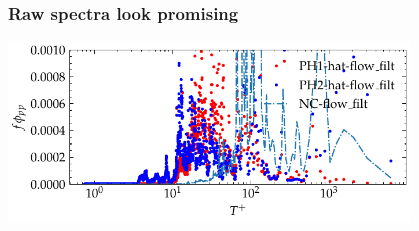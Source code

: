 \documentclass[aspectratio=169,9pt]{beamer}
\begin{document}
\begin{frame}
    \frametitle{Raw spectra look promising}
        \centering
        \includegraphics[width=0.8\textwidth]{sanity/50psi/03_10/calib_spectra_50psi_f_filt_recon.pdf}
\end{frame}
\end{document}
